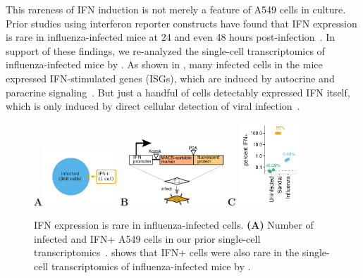 \documentclass[9pt,lineno]{elife}
\begin{document}
This rareness of IFN induction is not merely a feature of A549 cells in culture.
Prior studies using interferon reporter constructs have found that IFN expression is rare in influenza-infected mice at 24 and even 48 hours post-infection~\citep{kallfass2013visualizing}.
In support of these findings, we re-analyzed the single-cell transcriptomics of influenza-infected mice by \citet{steuerman2018dissection}.
As shown in , many infected cells in the mice expressed IFN-stimulated genes (ISGs), which are induced by autocrine and paracrine signaling~\citep{stetson2006type,honda2006type}.
But just a handful of cells detectably expressed IFN itself, which is only induced by direct cellular detection of viral infection~\citep{stetson2006type,honda2006type}.

\begin{figure}
\centerline{
{\bf \Large A}\includegraphics[width=0.25\textwidth,valign=t]{figures/IFN_stochastic/RussellVenn/venn_diagram.pdf}
\hspace{0.02\textwidth}
{\bf \Large B}\includegraphics[width=0.32\textwidth,valign=t]{figures/IFN_stochastic/IFN_reporter/IFN_reporter.pdf}
\hspace{0.02\textwidth}
{\bf \Large C} \includegraphics[width=0.2\textwidth,valign=t]{figures/IFN_stochastic/Flow/ifn_percent.pdf}
}
\caption{
IFN expression is rare in influenza-infected cells.
{\bf (A)} Number of infected and IFN+ A549 cells in our prior single-cell transcriptomics~\citep{russell2018extreme}.
 shows that IFN+ cells were also rare in the single-cell transcriptomics of influenza-infected mice by \citet{steuerman2018dissection}.
}
\end{figure}
\end{document}
